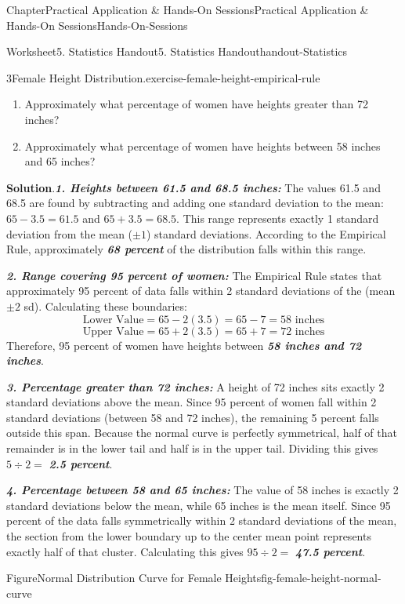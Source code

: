 \documentclass[oneside,10pt,]{book}
\newcommand{\blocktitlefont}{\relax}
\newcommand{\alert}[1]{\textbf{\textit{#1}}}
\begin{document}
\begin{chapterptx}{Chapter}{Practical Application \& Hands-On Sessions}{}{Practical Application \& Hands-On Sessions}{}{}{Hands-On-Sessions}
\begin{worksheet-section}{Worksheet}{5. Statistics Handout}{}{5. Statistics Handout}{}{}{handout-Statistics}
\begin{divisionexercise}{3}{Female Height Distribution.}{}{exercise-female-height-empirical-rule}
\begin{enumerate}[label={\arabic*}]
\item{}Approximately what percentage of women have heights greater than 72 inches?%
\item{}Approximately what percentage of women have heights between 58 inches and 65 inches?%
\end{enumerate}
%
\par\smallskip%
\noindent\textbf{\blocktitlefont Solution}.\hypertarget{exercise-female-height-empirical-rule-3}{}\quad{}\alert{1. Heights between 61.5 and 68.5 inches:} The values 61.5 and 68.5 are found by subtracting and adding one standard deviation to the mean: \(65 - 3.5 = 61.5\) and \(65 + 3.5 = 68.5\). This range represents exactly 1 standard deviation from the mean (\(\pm 1\)) standard deviations. According to the Empirical Rule, approximately \alert{68 percent} of the distribution falls within this range.%
\par
\alert{2. Range covering 95 percent of women:} The Empirical Rule states that approximately 95 percent of data falls within 2 standard deviations of the (mean \(\pm 2\) sd). Calculating these boundaries:%
\begin{equation*}
\text{Lower Value} = 65 - 2(3.5) = 65 - 7 = 58 \text{ inches}
\end{equation*}
%
\begin{equation*}
\text{Upper Value} = 65 + 2(3.5) = 65 + 7 = 72 \text{ inches}
\end{equation*}
Therefore, 95 percent of women have heights between \alert{58 inches and 72 inches}.%
\par
\alert{3. Percentage greater than 72 inches:} A height of 72 inches sits exactly 2 standard deviations above the mean. Since 95 percent of women fall within 2 standard deviations (between 58 and 72 inches), the remaining 5 percent falls outside this span. Because the normal curve is perfectly symmetrical, half of that remainder is in the lower tail and half is in the upper tail. Dividing this gives \(5 \div 2 = \) \alert{2.5 percent}.%
\par
\alert{4. Percentage between 58 and 65 inches:} The value of 58 inches is exactly 2 standard deviations below the mean, while 65 inches is the mean itself. Since 95 percent of the data falls symmetrically within 2 standard deviations of the mean, the section from the lower boundary up to the center mean point represents exactly half of that cluster. Calculating this gives \(95 \div 2 = \) \alert{47.5 percent}.%
\begin{figureptx}{Figure}{Normal Distribution Curve for Female Heights}{fig-female-height-normal-curve}{}%

\end{figureptx}
\end{divisionexercise}
\end{worksheet-section}
\end{chapterptx}
\end{document}
